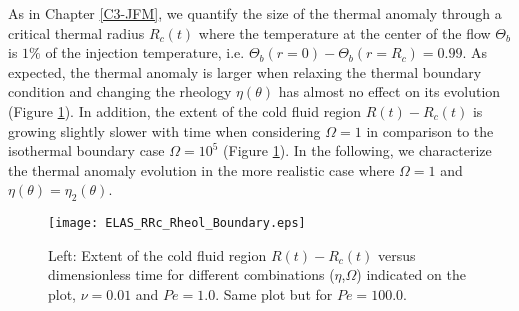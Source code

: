 As  in Chapter  \ref{C3-JFM},  we  quantify the  size  of the  thermal
anomaly  through   a  critical  thermal  radius   $R_c(t)$  where  the
temperature  at the  center of  the flow  $\Theta_b$ is  $1\%$ of  the
injection temperature,  i.e.  $\Theta_b(r=0)-\Theta_b(r=R_c)=0.99$. As
expected,  the thermal  anomaly is  larger when  relaxing the  thermal
boundary condition and changing the rheology $\eta(\theta)$ has almost
no        effect        on         its        evolution        (Figure
\ref{C4-ELAS_RRc_Rheol_Boundary}). In addition, the extent of the cold
fluid region $R(t)-R_c(t)$  is growing slightly slower  with time when
considering $\Omega=1$  in comparison to the  isothermal boundary case
$\Omega=10^5$   (Figure  \ref{C4-ELAS_RRc_Rheol_Boundary}).    In  the
following, we characterize  the thermal anomaly evolution  in the more
realistic case where $\Omega=1$ and $\eta(\theta)=\eta_2(\theta)$.

\begin{figure}[h!]
  \begin{center}
    \graphicspath{ {/Users/thorey/Documents/These/Projet/Refroidissement/Skin_Model/Figure/Figure_Heating/} }
    \texttt{[image: ELAS\_RRc\_Rheol\_Boundary.eps]}
    \caption{Left:  Extent  of  the cold  fluid  region  $R(t)-R_c(t)$
      versus   dimensionless    time   for    different   combinations
      ($\eta$,$\Omega$)   indicated  on   the  plot,   $\nu=0.01$  and
      $Pe=1.0$. Same plot but for $Pe=100.0$.}
    \label{C4-ELAS_RRc_Rheol_Boundary}
  \end{center}
\end{figure}

